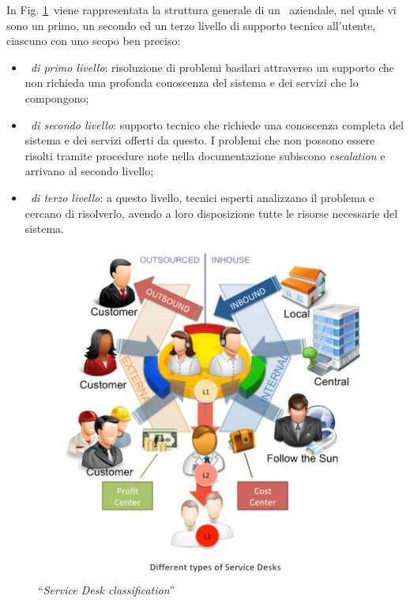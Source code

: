 	In Fig. \ref{fig:service-desk-types}~viene rappresentata la struttura generale di un \helpdesk~aziendale, nel quale vi sono un primo, un secondo ed un terzo livello di supporto tecnico all’utente, ciascuno con uno scopo ben preciso:
	\begin{itemize}[noitemsep]
		\item \textit{\helpdesk~di primo livello}: risoluzione di problemi basilari attraverso un supporto che non richieda una profonda conoscenza del sistema e dei servizi che lo compongono;
		\item \textit{\helpdesk~di secondo livello}: supporto tecnico che richiede una conoscenza completa del sistema e dei servizi offerti da questo. 
		I problemi che non possono essere risolti tramite procedure note nella documentazione subiscono \textit{escalation} e arrivano al secondo livello;
		\item \textit{\helpdesk~di terzo livello}: a questo livello, tecnici esperti analizzano il problema e cercano di risolverlo, avendo a loro disposizione tutte le risorse necessarie del sistema.
	\end{itemize}

	\begin{figure}[h!]
		\centering
		\includegraphics[width=\linewidth]{img/service-desk-types.jpg}
		\caption{``\textit{Service Desk classification}''\cite{service_desk}}
		\label{fig:service-desk-types}
	\end{figure}
	
